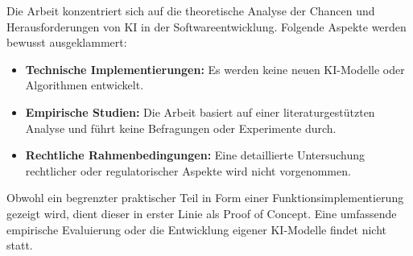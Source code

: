 Die Arbeit konzentriert sich auf die theoretische Analyse der Chancen und Herausforderungen von KI in der Softwareentwicklung. Folgende Aspekte werden bewusst ausgeklammert:

\begin{itemize}
    \item \textbf{Technische Implementierungen:} Es werden keine neuen KI-Modelle oder Algorithmen entwickelt.
    \item  \textbf{Empirische Studien:} Die Arbeit basiert auf einer literaturgestützten Analyse und führt keine Befragungen oder Experimente durch.
    \item \textbf{Rechtliche Rahmenbedingungen:} Eine detaillierte Untersuchung rechtlicher oder regulatorischer Aspekte wird nicht vorgenommen.
\end{itemize}

Obwohl ein begrenzter praktischer Teil in Form einer Funktionsimplementierung gezeigt wird, dient dieser in erster Linie als Proof of Concept. Eine umfassende empirische Evaluierung oder die Entwicklung eigener KI-Modelle findet nicht statt.